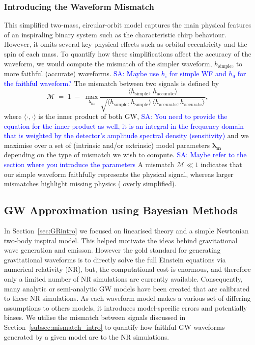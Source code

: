 \documentclass[12pt]{article}
\newcommand{\Sarp}[1]{{\textcolor{blue}{{SA: #1}} }}
\begin{document}
\subsubsection*{Introducing the Waveform Mismatch}
\label{subsec:mismatch_intro}
%
%
This simplified two-mass, circular-orbit model captures the main physical features of an inspiraling binary system such as the characteristic chirp behaviour. However, it omits several key physical effects such as orbital eccentricity and the spin of each mass. 
To quantify how these simplifications affect the accuracy of the waveform, we would compute the mismatch of
the simpler waveform, $h_\text{simple}$, to more faithful (accurate) waveforms. 
\Sarp{Maybe use $h_i$ for simple WF and $h_0$ for the faithful waveform?}
%
%
The mismatch between two signals is defined by \cite{mismatch, Ogpaper}
\begin{equation}
\label{eq:mismatch_def}
\mathcal{M} 
\;=\; 
1 \;-\;
\max_{\mathbf{\lambda_m}}
\frac{\langle h_{\text{simple}},\,h_{\text{accurate}}\rangle}
{\sqrt{\langle h_{\text{simple}},h_{\text{simple}}\rangle \,
\langle h_{\text{accurate}},h_{\text{accurate}}\rangle}},
\end{equation}
where \(\langle\cdot,\cdot\rangle\) is the inner product of both GW, 
\Sarp{You need to provide the equation for the inner product as well, it is an integral in the frequency domain that
is weighted by the detector's amplitude spectral density (sensitivity)}
and we maximise over a set of (intrinsic and/or extrinsic) model parameters \(\mathbf{\lambda_m}\) depending on the type of mismatch we wish to compute.
\Sarp{Maybe refer to the section where you introduce the parameters}
A mismatch \(\mathcal{M}\ll 1\) indicates that our simple waveform
faithfully represents the physical signal, whereas larger mismatches highlight missing
physics ( overly simplified).




\subsection{GW Approximation using Bayesian Methods}
\label{sec:GW_and_Bayes}

In Section~\ref{sec:GRintro} we focused on linearised theory and a simple Newtonian two-body inspiral model. This helped motivate the ideas behind gravitational wave generation and emisson.
However the gold standard for generating gravitational waveforms is to directly solve the full Einstein equations via numerical relativity (NR),
but, the computational cost is enormous, and therefore only a limited number of NR simulations are currently available.
Consequently, many analytic or semi-analytic GW models have been created that are calibrated to these NR simulations.
As each waveform model makes a various set of differing assumptions to others models, it introduces model-specific
errors and potentially biases.
We utilise the mismatch between signals discussed in Section~\ref{subsec:mismatch_intro} 
to quantify how faithful GW waveforms generated by a given model are to the NR simulations.
\end{document}
